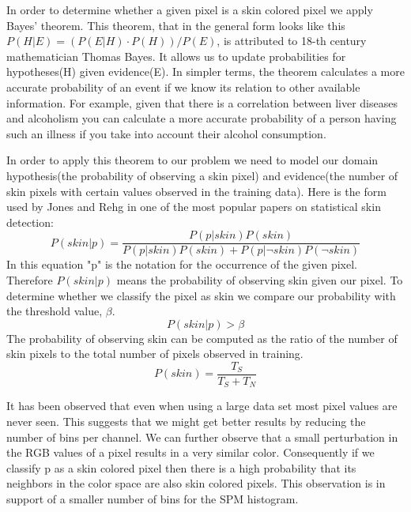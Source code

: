 \documentclass[12pt]{report}
\begin{document}
	In order to determine whether a given pixel is a skin colored pixel we apply Bayes' theorem. This theorem, that in the general form looks like this \( P(H|E) =(P(E|H) \cdot P(H)) / P(E) \), is attributed to 18-th century mathematician Thomas Bayes. It allows us to update probabilities for hypotheses(H) given evidence(E)\cite{bayes_theorem}. In simpler terms, the theorem calculates a more accurate probability of an event if we know its relation to other available information. For example, given that there is a correlation between liver diseases and alcoholism you can calculate a more accurate probability of a person having such an illness if you take into account their alcohol consumption.
	
	In order to apply this theorem to our problem we need to model our domain hypothesis(the probability of observing a skin pixel) and evidence(the number of skin pixels with certain values observed in the training data). Here is the form used by Jones and Rehg\cite{compaq} in one of the most popular papers on statistical skin detection:
	\begin{equation}
	P(skin|p) = \frac{P(p|skin)P(skin)}{P(p|skin)P(skin) + P(p|\neg skin)P(\neg skin)}
	\end{equation}
	In this equation "p" is the notation for the occurrence of the given pixel. Therefore $P(skin|p)$ means the probability of observing skin given our pixel. To determine whether we classify the pixel as skin we compare our probability with the threshold value, \( \beta \).
	\begin{equation}
	P(skin|p) > \beta
	\end{equation}
	The probability of observing skin can be computed as the ratio of the number of skin pixels to the total number of pixels observed in training.
	\begin{equation}
	P(skin) = \frac{T_S}{T_S + T_N}
	\end{equation}

	It has been observed that even when using a large data set most pixel values are never seen\cite{compaq}. This suggests that we might get better results by reducing the number of bins per channel. We can further observe that a small perturbation in the RGB values of a pixel results in a very similar color. Consequently if we classify p as a skin colored pixel then there is a high probability that its neighbors in the color space are also skin colored pixels. This observation is in support of a smaller number of bins for the SPM histogram. 
	
\end{document}
